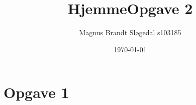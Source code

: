 \documentclass[11pt,a4paper]{article}
\begin{document}
\title{HjemmeOpgave 2}
\author{Magnus Brandt Sløgedal s103185}
\date{\today}
\maketitle
\section*{Opgave 1}

\end{document}
